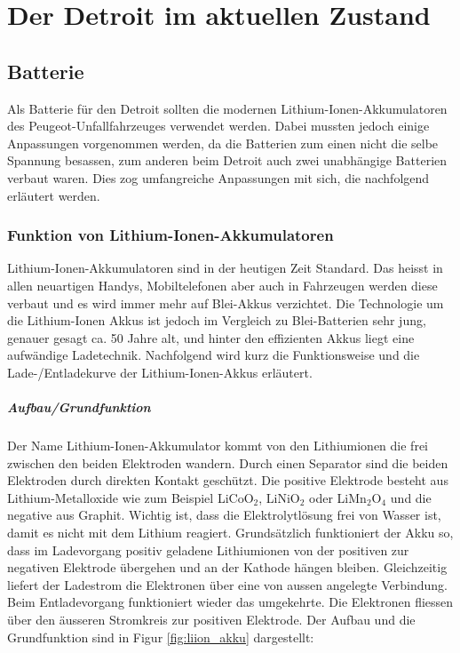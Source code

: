 \chapter{Der Detroit im aktuellen Zustand}

\section{Batterie}
Als Batterie für den Detroit sollten die modernen Lithium-Ionen-Akkumulatoren des Peugeot-Unfallfahrzeuges verwendet werden. Dabei mussten jedoch einige Anpassungen vorgenommen werden, da die Batterien zum einen nicht die selbe Spannung besassen, zum anderen beim Detroit auch zwei unabhängige Batterien verbaut waren. Dies zog umfangreiche Anpassungen mit sich, die nachfolgend erläutert werden.

\subsection{Funktion von Lithium-Ionen-Akkumulatoren} \label{kap_liion}

Lithium-Ionen-Akkumulatoren sind in der heutigen Zeit Standard. Das heisst in allen neuartigen Handys, Mobiltelefonen aber auch in Fahrzeugen werden diese verbaut und es wird immer mehr auf Blei-Akkus verzichtet. Die Technologie um die Lithium-Ionen Akkus ist jedoch im Vergleich zu Blei-Batterien sehr jung, genauer gesagt ca. 50 Jahre alt, und hinter den effizienten Akkus liegt eine aufwändige Ladetechnik. Nachfolgend wird kurz die Funktionsweise und die Lade-/Entladekurve der Lithium-Ionen-Akkus erläutert.

\paragraph{Aufbau/Grundfunktion}

Der Name Lithium-Ionen-Akkumulator kommt von den Lithiumionen die frei zwischen den beiden Elektroden wandern. Durch einen Separator sind die beiden Elektroden durch direkten Kontakt geschützt. Die positive Elektrode besteht aus Lithium-Metalloxide wie zum Beispiel LiCoO$_2$, LiNiO$_2$ oder LiMn$_2$O$_4$ und die negative aus Graphit. Wichtig ist, dass die Elektrolytlösung frei von Wasser ist, damit es nicht mit dem Lithium reagiert.
Grundsätzlich funktioniert der Akku so, dass im Ladevorgang positiv geladene Lithiumionen von der positiven zur negativen Elektrode übergehen und an der Kathode hängen bleiben. Gleichzeitig liefert der Ladestrom die Elektronen über eine von aussen angelegte Verbindung. Beim Entladevorgang funktioniert wieder das umgekehrte. Die Elektronen fliessen über den äusseren Stromkreis zur positiven Elektrode. Der Aufbau und die Grundfunktion sind in Figur \ref{fig:liion_akku} dargestellt: \cite{liion_akku_aufbau_funktion2}

